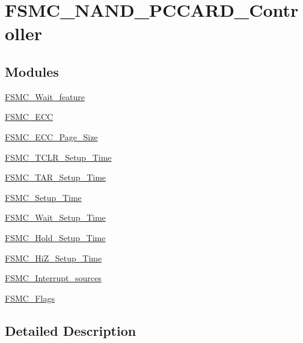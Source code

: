 \hypertarget{group___f_s_m_c___n_a_n_d___p_c_c_a_r_d___controller}{}\section{F\+S\+M\+C\+\_\+\+N\+A\+N\+D\+\_\+\+P\+C\+C\+A\+R\+D\+\_\+\+Controller}
\label{group___f_s_m_c___n_a_n_d___p_c_c_a_r_d___controller}
\subsection*{Modules}
\begin{DoxyCompactItemize}
\item 
\hyperlink{group___f_s_m_c___wait__feature}{F\+S\+M\+C\+\_\+\+Wait\+\_\+feature}
\item 
\hyperlink{group___f_s_m_c___e_c_c}{F\+S\+M\+C\+\_\+\+E\+C\+C}
\item 
\hyperlink{group___f_s_m_c___e_c_c___page___size}{F\+S\+M\+C\+\_\+\+E\+C\+C\+\_\+\+Page\+\_\+\+Size}
\item 
\hyperlink{group___f_s_m_c___t_c_l_r___setup___time}{F\+S\+M\+C\+\_\+\+T\+C\+L\+R\+\_\+\+Setup\+\_\+\+Time}
\item 
\hyperlink{group___f_s_m_c___t_a_r___setup___time}{F\+S\+M\+C\+\_\+\+T\+A\+R\+\_\+\+Setup\+\_\+\+Time}
\item 
\hyperlink{group___f_s_m_c___setup___time}{F\+S\+M\+C\+\_\+\+Setup\+\_\+\+Time}
\item 
\hyperlink{group___f_s_m_c___wait___setup___time}{F\+S\+M\+C\+\_\+\+Wait\+\_\+\+Setup\+\_\+\+Time}
\item 
\hyperlink{group___f_s_m_c___hold___setup___time}{F\+S\+M\+C\+\_\+\+Hold\+\_\+\+Setup\+\_\+\+Time}
\item 
\hyperlink{group___f_s_m_c___hi_z___setup___time}{F\+S\+M\+C\+\_\+\+Hi\+Z\+\_\+\+Setup\+\_\+\+Time}
\item 
\hyperlink{group___f_s_m_c___interrupt__sources}{F\+S\+M\+C\+\_\+\+Interrupt\+\_\+sources}
\item 
\hyperlink{group___f_s_m_c___flags}{F\+S\+M\+C\+\_\+\+Flags}
\end{DoxyCompactItemize}


\subsection{Detailed Description}
